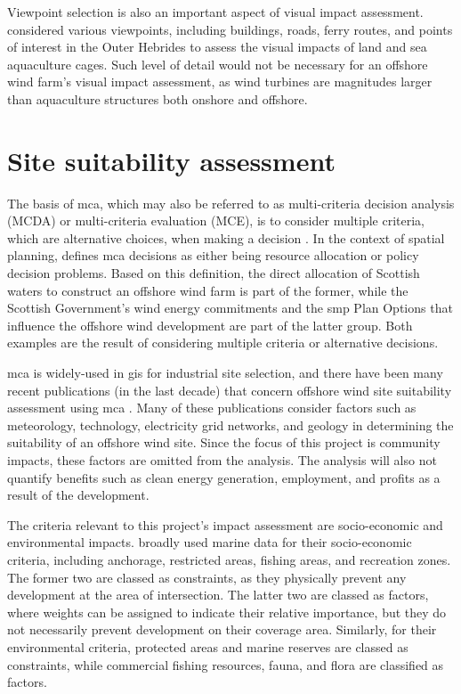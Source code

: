 Viewpoint selection is also an important aspect of visual impact assessment. \cite{falconer2013} considered various viewpoints, including buildings, roads, ferry routes, and points of interest in the Outer Hebrides to assess the visual impacts of land and sea aquaculture cages. Such level of detail would not be necessary for an offshore wind farm's visual impact assessment, as wind turbines are magnitudes larger than aquaculture structures both onshore and offshore.

\section{Site suitability assessment}

The basis of \gls{mca}, which may also be referred to as multi-criteria decision analysis (MCDA) or multi-criteria evaluation (MCE), is to consider multiple criteria, which are alternative choices, when making a decision \autocite{dean2020,eastman2005-mca}. In the context of spatial planning, \cite{eastman2005-mca} defines \gls{mca} decisions as either being resource allocation or policy decision problems. Based on this definition, the direct allocation of Scottish waters to construct an offshore wind farm is part of the former, while the Scottish Government's wind energy commitments and the \gls{smp} Plan Options that influence the offshore wind development are part of the latter group. Both examples are the result of considering multiple criteria or alternative decisions.

\gls{mca} is widely-used in \gls{gis} for industrial site selection, and there have been many recent publications (in the last decade) that concern offshore wind site suitability assessment using \gls{mca} \autocite{gaveriaux2019,mekonnen2015,vasileiou2017,tercan2020,deveci2020,mahdy2018,basset2021}. Many of these publications consider factors such as meteorology, technology, electricity grid networks, and geology in determining the suitability of an offshore wind site. Since the focus of this project is community impacts, these factors are omitted from the analysis. The analysis will also not quantify benefits such as clean energy generation, employment, and profits as a result of the development.

The criteria relevant to this project's impact assessment are socio-economic and environmental impacts. \cite{gaveriaux2019} broadly used marine data for their socio-economic criteria, including anchorage, restricted areas, fishing areas, and recreation zones. The former two are classed as constraints, as they physically prevent any development at the area of intersection. The latter two are classed as factors, where weights can be assigned to indicate their relative importance, but they do not necessarily prevent development on their coverage area. Similarly, for their environmental criteria, protected areas and marine reserves are classed as constraints, while commercial fishing resources, fauna, and flora are classified as factors.

